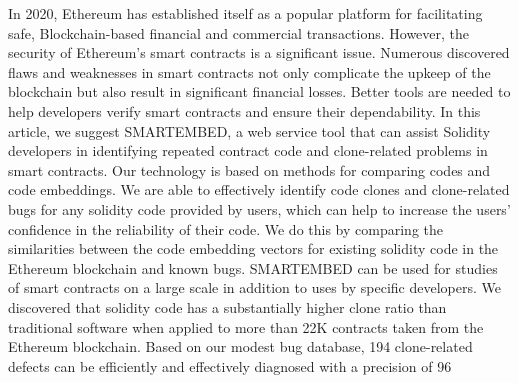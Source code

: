 In 2020, Ethereum has established itself as a popular platform for facilitating safe, Blockchain-based financial and commercial transactions.
However, the security of Ethereum's smart contracts is a significant issue.
Numerous discovered flaws and weaknesses in smart contracts not only complicate the upkeep of the blockchain but also result in significant financial losses. Better tools are needed to help developers verify smart contracts and ensure their dependability.
In this article, we suggest SMARTEMBED, a web service tool that can assist Solidity developers in identifying repeated contract code and clone-related problems in smart contracts.
Our technology is based on methods for comparing codes and code embeddings.
We are able to effectively identify code clones and clone-related bugs for any solidity code provided by users, which can help to increase the users' confidence in the reliability of their code. We do this by comparing the similarities between the code embedding vectors for existing solidity code in the Ethereum blockchain and known bugs.
SMARTEMBED can be used for studies of smart contracts on a large scale in addition to uses by specific developers.
We discovered that solidity code has a substantially higher clone ratio than traditional software when applied to more than 22K contracts taken from the Ethereum blockchain. Based on our modest bug database, 194 clone-related defects can be efficiently and effectively diagnosed with a precision of 96%


